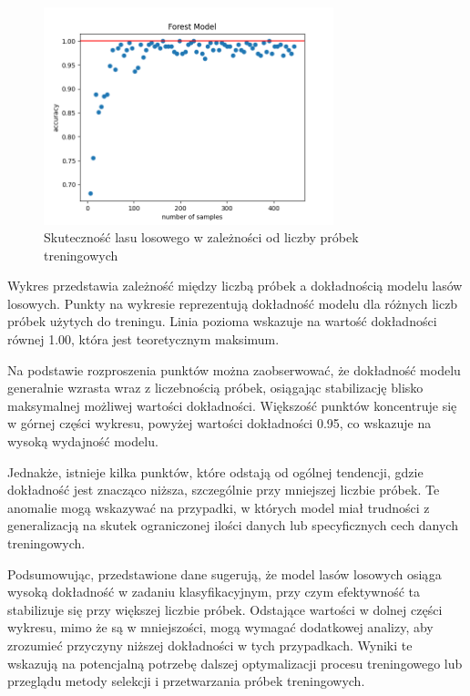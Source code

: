 \documentclass{article}
\begin{document}
\begin{figure}[H]
    \centering
    \includegraphics[width=0.75\textwidth]{transfer_labelling_forest.png}
    \caption{Skuteczność lasu losowego w zależności od liczby próbek treningowych}
\end{figure}

Wykres przedstawia zależność między liczbą próbek a dokładnością modelu lasów losowych. Punkty na wykresie reprezentują dokładność modelu dla różnych liczb próbek użytych do treningu. Linia pozioma wskazuje na wartość dokładności równej 1.00, która jest teoretycznym maksimum.

Na podstawie rozproszenia punktów można zaobserwować, że dokładność modelu generalnie wzrasta wraz z liczebnością próbek, osiągając stabilizację blisko maksymalnej możliwej wartości dokładności. Większość punktów koncentruje się w górnej części wykresu, powyżej wartości dokładności 0.95, co wskazuje na wysoką wydajność modelu.

Jednakże, istnieje kilka punktów, które odstają od ogólnej tendencji, gdzie dokładność jest znacząco niższa, szczególnie przy mniejszej liczbie próbek. Te anomalie mogą wskazywać na przypadki, w których model miał trudności z generalizacją na skutek ograniczonej ilości danych lub specyficznych cech danych treningowych.

Podsumowując, przedstawione dane sugerują, że model lasów losowych osiąga wysoką dokładność w zadaniu klasyfikacyjnym, przy czym efektywność ta stabilizuje się przy większej liczbie próbek. Odstające wartości w dolnej części wykresu, mimo że są w mniejszości, mogą wymagać dodatkowej analizy, aby zrozumieć przyczyny niższej dokładności w tych przypadkach. Wyniki te wskazują na potencjalną potrzebę dalszej optymalizacji procesu treningowego lub przeglądu metody selekcji i przetwarzania próbek treningowych.
\end{document}
